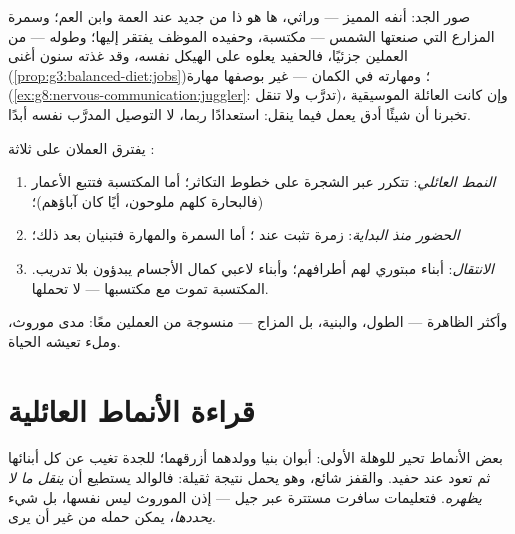 \begin{example}\label{ex:g9:heredity-and-traits:album}
صور الجد: أنفه المميز --- وراثي، ها هو ذا من جديد عند
العمة وابن العم؛ وسمرة المزارع التي صنعتها الشمس ---
مكتسبة، وحفيده الموظف يفتقر إليها؛ وطوله --- من العملين
جزئيًا، فالحفيد يعلوه على الهيكل نفسه، وقد غذته سنون
أغنى (\cref{prop:g3:balanced-diet:jobs})؛ ومهارته في
الكمان --- غير  بوصفها مهارة
(\cref{ex:g8:nervous-communication:juggler}: 
تدرَّب ولا تنقل)، وإن كانت العائلة الموسيقية تخبرنا أن
شيئًا أدق يعمل فيما ينقل: استعدادًا ربما، لا التوصيل
المدرَّب نفسه أبدًا.
\end{example}

\begin{proposition}\label{prop:g9:heredity-and-traits:sorting}
يفترق العملان على ثلاثة :
\begin{enumerate}
  \item \emph{النمط العائلي}:   تتكرر عبر
        الشجرة على خطوط التكاثر؛ أما المكتسبة فتتبع
        الأعمار (فالبحارة كلهم ملوحون، أيًا كان آباؤهم)؛
  \item \emph{الحضور منذ البداية}: زمرة  تثبت عند
        ؛ أما السمرة والمهارة فتبنيان بعد ذلك؛
  \item \emph{الانتقال}: أبناء مبتوري  لهم
        أطرافهم؛ وأبناء لاعبي كمال الأجسام يبدؤون بلا
        تدريب.  المكتسبة تموت مع مكتسبها ---
         لا تحملها.
\end{enumerate}
وأكثر  الظاهرة --- الطول، والبنية، بل المزاج ---
منسوجة من العملين معًا: مدى موروث، وملء تعيشه الحياة.
\end{proposition}
\admitted

\section{قراءة الأنماط العائلية}

\begin{example}\label{ex:g9:heredity-and-traits:skip}
بعض الأنماط تحير للوهلة الأولى: أبوان بنيا 
وولدهما أزرقهما؛  للجدة تغيب عن كل أبنائها ثم تعود
عند حفيد. والقفز شائع، وهو يحمل نتيجة ثقيلة: فالوالد
يستطيع أن \emph{ينقل ما لا يظهره}. فتعليمات  سافرت
مستترة عبر جيل --- إذن الموروث ليس  نفسها، بل شيء
\emph{يحددها}، يمكن حمله من غير أن يرى.
\end{example}

